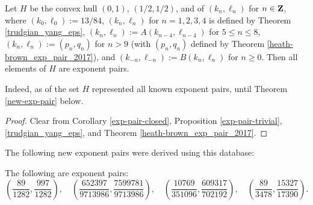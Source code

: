 \begin{corollary}\label{H-pairs}\cite[Theorem 1.3]{trudgian-yang}  Let $H$ be the convex hull $(0,1)$, $(1/2,1/2)$, and of $(k_n,\ell_n)$ for $n \in \mathbf{Z}$, where $(k_0,\ell_0) := 13/84$, $(k_n,\ell_n)$ for $n=1,2,3,4$ is defined by Theorem \ref{trudgian_yang_eps}, $(k_n,\ell_n) := A(k_{n-4},\ell_{n-4})$ for $5 \leq n \leq 8$, $(k_n,\ell_n) := (p_n,q_n)$ for $n > 9$ (with $(p_n,q_n)$ defined by Theorem \ref{heath-brown_exp_pair_2017}), and $(k_{-n},\ell_{-n}) := B(k_n,\ell_n)$ for $n \geq 0$.  Then all elements of $H$ are exponent pairs.
\end{corollary}

Indeed, as of \cite{trudgian-yang} the set $H$ represented all known exponent pairs, until Theorem \ref{new-exp-pair} below.

\begin{proof} Clear from Corollary \ref{exp-pair-closed}, Proposition \ref{exp-pair-trivial}, \ref{trudgian_yang_eps}, and Theorem \ref{heath-brown_exp_pair_2017}.
\end{proof}

The following new exponent pairs were derived using this database:

\begin{theorem}\label{new-exp-pair} The following are exponent pairs:
\[
\left(\frac{89}{1282}, \frac{997}{1282}\right),\quad \left(\frac{652397}{9713986}, \frac{7599781}{9713986}\right),\quad \left(\frac{10769}{351096}, \frac{609317}{702192}\right),\quad \left(\frac{89}{3478}, \frac{15327}{17390}\right).
\]
\end{theorem}
\derived
{}

